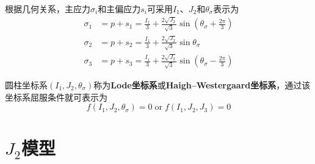 根据几何关系，主应力$\sigma_i$和主偏应力$s_i$可采用$I_1$、$J_2$和$\theta_\sigma$表示为
\begin{equation}
    \begin{split}
        \sigma_1 &= p+s_1 = \frac{I_1}{3} + \frac{2\sqrt{J_2}}{\sqrt 3}\sin(\theta_\sigma + \frac{2\pi}{3}) \\
        \sigma_2 &= p+s_2 = \frac{I_1}{3} + \frac{2\sqrt{J_2}}{\sqrt 3}\sin \theta_\sigma \\
        \sigma_3 &= p+s_3 = \frac{I_1}{3} + \frac{2\sqrt{J_2}}{\sqrt 3}\sin(\theta_\sigma - \frac{2\pi}{3})
    \end{split}
\end{equation} \par
圆柱坐标系$(I_1,J_2,\theta_\sigma)$称为\textbf{Lode坐标系}或\textbf{Haigh–Westergaard坐标系}，通过该坐标系屈服条件就可表示为
\begin{equation}
    f(I_1,J_2,\theta_\sigma) = 0 \; \mathrm{or} \; f(I_1,J_2,J_3) = 0
\end{equation}
\section{$J_2$模型}
